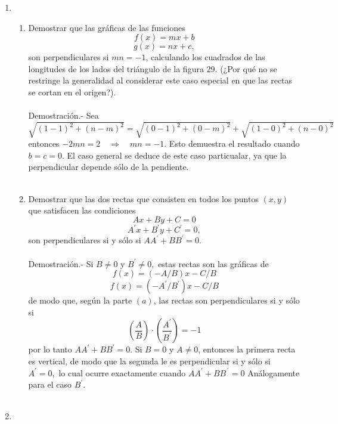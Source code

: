 \begin{enumerate}
    \item 
    \begin{enumerate}[\bfseries (a)]

	\item Demostrar que las gráficas de las funciones $$f(x)=mx+b$$ $$g(x)=nx+c,$$ son perpendiculares si $mn=-1$, calculando los cuadrados de las longitudes de los lados del triángulo de la figura 29. (¿Por qué no se restringe la generalidad al considerar este caso especial en que las rectas se cortan en el origen?).\\\\
	    Demostración.-\; Sea $\sqrt{(1-1)^2+(n-m)^2} = \sqrt{(0-1)^2+(0-m)^2} + \sqrt{(1-0)^2+(n-0)^2}$ entonces $-2mn=2 \quad \Rightarrow \quad mn=-1$. Esto demuestra el resultado cuando $b=c=0$. El caso general se deduce de este caso particualar, ya que la perpendicular depende sólo de la pendiente.\\\\

	\item Demostrar que las dos rectas que consisten en todos los puntos $(x,y)$ que satisfacen las condiciones $$Ax +By +C=0$$ $$A^{'}x + B^{'} y + C^{'} = 0,$$ son perpendiculares si y sólo si $AA^{'} + BB^{'} = 0$.\\\\
	    Demostración.-\; Si $B\neq 0$ y $B^{'} \neq 0,$ estas rectas son las gráficas de $$f(x)=(-A/B)x - C/B$$ $$f(x)=(-A^{'}/B^{'})x - C/B$$ de modo que, según la parte $(a)$, las rectas son perpendiculares si y sólo si $$\left(\dfrac{A}{B}\right)\cdot \left(\dfrac{A^{'}}{B^{'}}\right)=-1$$ por lo tanto $AA^{'}+BB^{'}=0$. Si $B=0$ y $A\neq 0$, entonces la primera recta es vertical, de modo que la segunda le es perpendicular si y sólo si $A^{'}=0,$ lo cual ocurre exactamente cuando $AA^{'} + BB^{´}=0$ Análogamente para el caso $B^{'}$.\\\\

    \end{enumerate}
    
    \item 

\end{enumerate}
